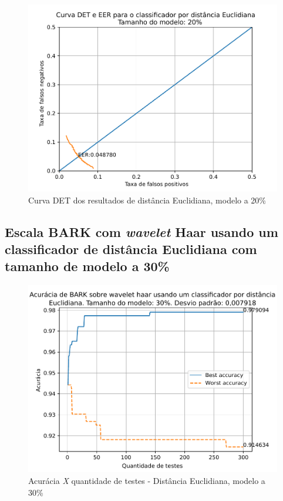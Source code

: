 			\begin{figure}[ht]
				\centering
				\includegraphics[width=\linewidth]{images/results/det/DET_for_classifier_Euclidian_20}
				\caption{Curva DET dos resultados de distância Euclidiana, modelo a 20\%}
				\label{fig:detforclassifiereuclidian20}
			\end{figure}

			\forceNewPage
		\subsection{Escala BARK com \textit{wavelet} Haar usando um classificador de distância Euclidiana com tamanho de modelo a 30\%}
		
			
		
			\begin{figure}[ht]
				\centering
				\includegraphics[width=\linewidth]{images/results/confusionMatrices/classifier_Euclidian_30}
				\caption{Acurácia \textit{X} quantidade de testes - Distância Euclidiana, modelo a 30\%}
				\label{fig:classifiereuclidian30}
			\end{figure}
		
